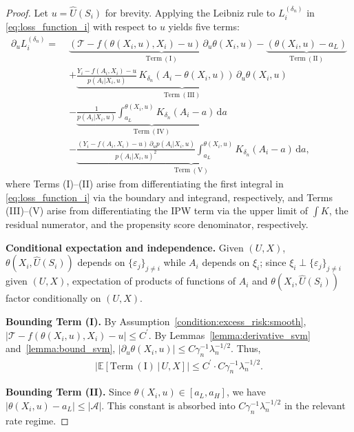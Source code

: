 \documentclass[12pt]{article}
\newcommand{\E}{\mathbb{E}}
\begin{document}
\begin{proof}
Let $u=\widehat U(S_i)$ for brevity.  Applying the Leibniz rule to $L^{(\delta_n)}_i$ in \eqref{eq:loss_function_i} with respect to $u$ yields five terms:
\begin{align*}
\partial_u L^{(\delta_n)}_i
=\;&\underbrace{(\mathcal{T}-f(\theta(X_i,u),X_i)-u)\,\partial_u\theta(X_i,u)}_{\mathrm{Term\ (I)}}
  - \underbrace{(\theta(X_i,u)-a_L)}_{\mathrm{Term\ (II)}}\\
&+\underbrace{\frac{Y_i-f(A_i,X_i)-u}{p(A_i|X_i,u)}\,K_{\delta_n}(A_i-\theta(X_i,u))\,\partial_u\theta(X_i,u)}_{\mathrm{Term\ (III)}}\\
&-\underbrace{\frac{1}{p(A_i|X_i,u)}\int_{a_L}^{\theta(X_i,u)}K_{\delta_n}(A_i-a)\,\mathrm{d}a}_{\mathrm{Term\ (IV)}}\\
&-\underbrace{\frac{(Y_i-f(A_i,X_i)-u)\,\partial_u p(A_i|X_i,u)}{p(A_i|X_i,u)^2}\int_{a_L}^{\theta(X_i,u)}K_{\delta_n}(A_i-a)\,\mathrm{d}a}_{\mathrm{Term\ (V)}},
\end{align*}
where Terms (I)--(II) arise from differentiating the first integral in \eqref{eq:loss_function_i} via the boundary and integrand, respectively, and Terms (III)--(V) arise from differentiating the IPW term via the upper limit of $\int K$, the residual numerator, and the propensity score denominator, respectively.

\noindent\textbf{Conditional expectation and independence.}
Given $(U,X)$, $\theta(X_i,\widehat{U}(S_i))$ depends on $\{\varepsilon_j\}_{j\neq i}$ while $A_i$ depends on $\xi_i$; since $\xi_i\perp\{\varepsilon_j\}_{j\neq i}$ given $(U,X)$, expectation of products of functions of $A_i$ and $\theta(X_i,\widehat{U}(S_i))$ factor conditionally on $(U,X)$.

\noindent\textbf{Bounding Term (I).}
By Assumption~\ref{condition:excess_risk:smooth}, $|\mathcal{T}-f(\theta(X_i,u),X_i)-u|\leq C^\prime$.  By Lemmas~\ref{lemma:derivative_svm} and~\ref{lemma:bound_svm}, $|\partial_u\theta(X_i,u)|\leq C\gamma_n^{-1}\lambda_n^{-1/2}$.  Thus,
\begin{align*}
\left|\E\!\left[\mathrm{Term\ (I)}\,\big|\,U,X\right]\right| \leq C^\prime\cdot C\gamma_n^{-1}\lambda_n^{-1/2}.
\end{align*}

\noindent\textbf{Bounding Term (II).}
Since $\theta(X_i,u)\in[a_L,a_H]$, we have $|\theta(X_i,u)-a_L|\leq |\mathcal{A}|$.  This constant is absorbed into $C\gamma_n^{-1}\lambda_n^{-1/2}$ in the relevant rate regime.


\end{proof}
\end{document}
